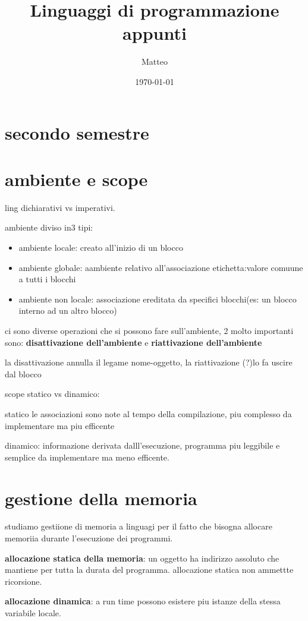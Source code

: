 \documentclass[12pt]{article}
\title{Linguaggi di programmazione appunti}
\author{Matteo}
\date{\today}
\begin{document}
\maketitle

\section{secondo semestre}
\section{ambiente e scope}
ling dichiarativi vs imperativi.

ambiente diviso in3 tipi:
\begin{itemize}
\item ambiente locale: creato all'inizio di un blocco
\item ambiente globale: aambiente relativo all'associazione etichetta:valore comuune  a tutti i blocchi
\item ambiente non locale: associazione ereditata da specifici blocchi(es: un blocco interno ad un altro blocco)
\end{itemize}


ci sono diverse operazioni che si possono fare sull'ambiente, 2 molto importanti sono: \textbf{disattivazione dell'ambiente} e  \textbf{riattivazione dell'ambiente}

la disattivazione annulla il legame nome-oggetto, la riattivazione (?)lo fa uscire dal blocco

scope statico vs dinamico:

statico le associazioni sono note al tempo della compilazione, piu complesso da implementare ma piu efficente

dinamico: informazione derivata dalll'esecuzione, programma piu leggibile e semplice da implementare ma meno efficente.


\section{gestione della memoria}

studiamo gestiione di memoria a linguagi per il fatto che bisogna allocare memoriia durante l'esecuzione dei programmi.

\textbf{allocazione statica della memoria}: un oggetto ha indirizzo assoluto che mantiene per tutta la durata del programma. allocazione statica non ammettte ricorsione.

\textbf{allocazione dinamica}: a run time possono esistere piu istanze della stessa variabile locale.
\end{document}
